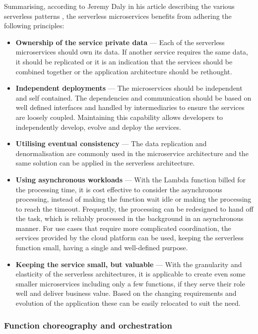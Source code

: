 Summarising, according to Jeremy Daly in his article describing the various serverless patterns \cite{ServerlessMicroservicePatternsForAWS}, the serverless microservices benefits from adhering the following principles:

\begin{itemize}
   \item \textbf{Ownership of the service private data} --- Each of the serverless microservices should own its data. If another service requires the same data, it should be replicated or it is an indication that the services should be combined together or the application architecture should be rethought.
   \item \textbf{Independent deployments} --- The microservices should be independent and self contained. The dependencies and communication should be based on well defined interfaces and handled by intermediaries to ensure the services are loosely coupled. Maintaining this capability allows developers to independently develop, evolve and deploy the services.
   \item \textbf{Utilising eventual consistency} --- The data replication and denormalisation are commonly used in the microservice architecture and the same solution can be applied in the serverless architecture.
   \item \textbf{Using asynchronous workloads} ---
   With the Lambda function billed for the processing time, it is cost effective to consider the asynchronous processing, instead of making the function wait idle or making the processing to reach the timeout.
   Frequently, the processing can be redesigned to hand off the task, which is reliably processed in the background in an asynchronous manner.
   For use cases that require more complicated coordination, the services provided by the cloud platform can be used, keeping the serverless function small, having a single and well-defined purpose.
   \item \textbf{Keeping the service small, but valuable} ---
   With the granularity and elasticity of the serverless architectures, it is applicable to create even some smaller microservices including only a few functions, if they serve their role well and deliver business value.
   Based on the changing requirements and evolution of the application these can be easily relocated to suit the need.
\end{itemize}

\subsubsection{Function choreography and orchestration} \label{chapter:serverless-processing-function-composition-and-orchestration}

